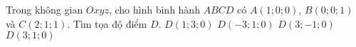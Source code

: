 \begin{ex}%
Trong không gian $Oxyz$, cho hình bình hành $ABCD$ có $A(1; 0; 0)$, $B(0; 0; 1)$ và $C(2; 1; 1)$. Tìm tọa độ điểm $D$.
\choice
{$D(1; 3; 0)$	}
{$D(-3; 1; 0)$}
{$D(3; -1; 0)$}
{\True $D(3; 1; 0)$}
\end{ex}

